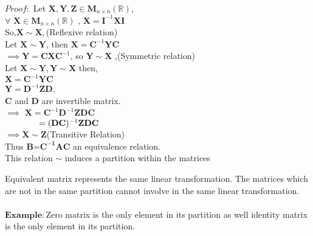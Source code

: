 \documentclass[12pt]{article}
\theoremstyle{definition}
\begin{document}
	  $\mathit{ Proof}:$ Let $\mathbf{X},\mathbf{Y},\mathbf{Z}\in \mathbf{M}_{n\times n}(\mathbb{R})$,\\
	  $\forall$ $\mathbf{X}\in \mathbf{M}_{n\times n}(\mathbb{R})$ , $\mathbf{X}={\mathbf{I}}^{-1}\mathbf{X}\mathbf{I}$ \\
	  So,$\mathbf{X} \sim \mathbf{X}, $(Reflexive relation)\\
	  Let $\mathbf{X} \sim \mathbf{Y}$, then $\mathbf{X}={\mathbf{C}}^{-1}\mathbf{Y}\mathbf{C}$\\
	  $\implies \mathbf{Y}=\mathbf{C}\mathbf{X}{\mathbf{C}}^{-1}$, so $\mathbf{Y} \sim \mathbf{X}$ ,(Symmetric relation)\\
	  Let $\mathbf{X} \sim \mathbf{Y}, \mathbf{Y} \sim \mathbf{X}$ then,\\
	  $\mathbf{X}={\mathbf{C}}^{-1}\mathbf{Y}\mathbf{C}$\\
	  $\mathbf{Y}={\mathbf{D}}^{-1}\mathbf{Z}\mathbf{D}$,\\ $\mathbf{C}$ and $\mathbf{D}$ are invertible matrix. \\
	  $\implies $ $\mathbf{X}={\mathbf{C}}^{-1}{\mathbf{D}}^{-1}\mathbf{Z}\mathbf{D}\mathbf{C}$\\
	  $\hspace*{1.4cm}=({\mathbf{D}\mathbf{C}})^{-1}\mathbf{Z}\mathbf{D}\mathbf{C}$\\
	  $\implies \mathbf{X}\sim\mathbf{Z}$(Transitive Relation)\\
	  Thus $\mathbf{B}$=$\mathbf{C^{-1}}\mathbf{A}\mathbf{C}$ an equivalence relation.\\
	  This relation $\sim$ induces a partition within the matrices \\
	  \begin{center}
	  \end{center}
	  Equivalent matrix represents the same linear transformation. The matrices which are not in the same partition cannot involve in the same linear transformation.\\
	  \\
	  $\mathbf{Example:}$Zero matrix is the only element in its partition as well identity matrix is the only element in its partition.
\end{document}
